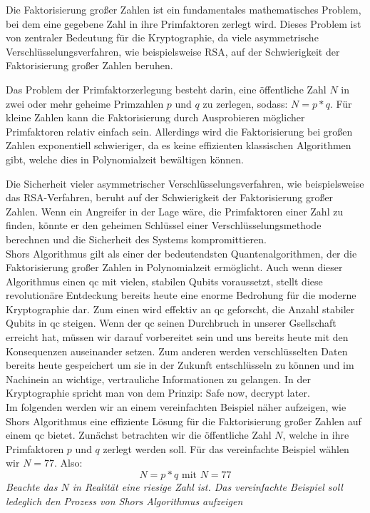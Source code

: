 Die Faktorisierung großer Zahlen \cite[S189]{bernstein_post-quantum_2017} ist ein fundamentales mathematisches Problem, 
bei dem eine gegebene Zahl in ihre Primfaktoren zerlegt wird.
Dieses Problem ist von zentraler Bedeutung für die Kryptographie, da viele asymmetrische Verschlüsselungsverfahren, wie beispielsweise RSA, 
auf der Schwierigkeit der Faktorisierung großer Zahlen beruhen.

Das Problem der Primfaktorzerlegung besteht darin, eine öffentliche Zahl $N$ in zwei oder mehr geheime Primzahlen $p$ und $q$ zu zerlegen, sodass: $N = p*q$. 
Für kleine Zahlen kann die Faktorisierung durch Ausprobieren möglicher Primfaktoren relativ einfach sein. 
Allerdings wird die Faktorisierung bei großen Zahlen exponentiell schwieriger, 
da es keine effizienten klassischen Algorithmen gibt, welche dies in Polynomialzeit bewältigen können.

Die Sicherheit vieler asymmetrischer Verschlüsselungsverfahren, 
wie beispielsweise das RSA-Verfahren, beruht auf der Schwierigkeit der Faktorisierung großer Zahlen. 
Wenn ein Angreifer in der Lage wäre, die Primfaktoren einer Zahl zu finden, 
könnte er den geheimen Schlüssel einer Verschlüsselungsmethode berechnen und die Sicherheit des Systems kompromittieren.\\

Shors Algorithmus \cite{shor_algorithms_1994} gilt als einer der bedeutendsten Quantenalgorithmen, 
der die Faktorisierung großer Zahlen in Polynomialzeit ermöglicht. 
Auch wenn dieser Algorithmus einen \ac{qc} mit vielen, stabilen Qubits voraussetzt, 
stellt diese revolutionäre Entdeckung bereits heute eine enorme Bedrohung für die moderne Kryptographie dar.
Zum einen wird effektiv an \ac{qc} geforscht, die Anzahl stabiler Qubits in \ac{qc} steigen. 
Wenn der \ac{qc} seinen Durchbruch in unserer Gsellschaft erreicht hat, müssen wir darauf vorbereitet sein und uns bereits heute mit den Konsequenzen auseinander setzen. 
Zum anderen werden verschlüsselten Daten bereits heute gespeichert um sie in der Zukunft entschlüsseln zu können und 
im Nachinein an wichtige, vertrauliche Informationen zu gelangen. In der Kryptographie spricht man von dem Prinzip: \glqq Safe now, decrypt later\grqq.\\

Im folgenden \cite{kak_lecture_nodate}\cite[S. 4-5]{gidney_how_2021} werden wir an einem vereinfachten Beispiel näher aufzeigen, 
wie Shors Algorithmus eine effiziente Lösung für die Faktorisierung großer Zahlen auf einem \ac{qc} bietet.
Zunächst betrachten wir die öffentliche Zahl $N$, welche in ihre Primfaktoren $p$ und $q$ zerlegt werden soll. 
Für das vereinfachte Beispiel wählen wir $N = 77$. Also: $$N = p*q \textrm{ mit } N= 77$$
\textit{Beachte das $N$ in Realität eine riesige Zahl ist. Das vereinfachte Beispiel soll ledeglich den Prozess von Shors Algorithmus aufzeigen}

